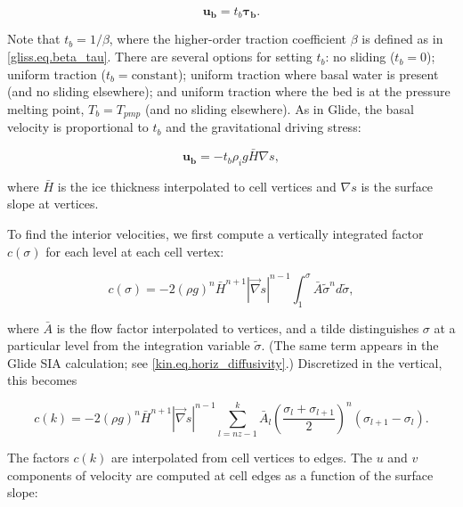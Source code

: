 {\begin{equation}
  \mathbf{u_b} = t_b \mathbf{\tau_b}.
\end{equation}

\noindent
Note that $t_b = 1/\beta$, where the higher-order traction coefficient $\beta$ 
is defined as in \eqref{gliss.eq.beta_tau}.
There are several options for setting $t_b$: no sliding ($t_b = 0$);
uniform traction ($t_b = \mathrm{constant}$); uniform traction where basal water is present
(and no sliding elsewhere); and uniform traction where the bed is at the pressure melting point,
$T_b = T_{pmp}$ (and no sliding elsewhere).
As in Glide, the basal velocity is proportional to $t_b$ and the gravitational driving stress:

\begin{equation}
  \label{gliss.eq.velo_bed_sia}
        \mathbf{u_b} = -{{t}_{b}}{{\rho }_{i}} g \bar{H} \nabla s,
\end{equation}

\noindent
where $\bar{H}$ is the ice thickness interpolated to cell vertices
and $\nabla s$ is the surface slope at vertices.

To find the interior velocities, we
first compute a vertically integrated factor $c(\sigma)$ for each level at each cell vertex:

\begin{equation}
  \label{gliss.eq.vert_factor_sia}
  c(\sigma) = -2(\rho g)^n \bar{H}^{n+1} |\vec\nabla s|^{n-1} \int_1^{\sigma} \bar{A} \tilde{\sigma}^n d\tilde{\sigma},
\end{equation}

\noindent
where $\bar{A}$ is the flow factor interpolated to vertices,
and a tilde distinguishes $\sigma$ at a particular level from the integration variable $\tilde{\sigma}$.
(The same term appears in the Glide SIA calculation; see \eqref{kin.eq.horiz_diffusivity}.)
Discretized in the vertical, this becomes

\begin{equation}
  \label{gliss.eq.vert_factor_sia_discrete}
  c(k) = -2(\rho g)^n \bar{H}^{n+1} |\vec\nabla s|^{n-1} 
  \sum\limits_{l=nz-1}^{k} {{{{\bar{A}}}_{l}}}{{\left( \frac{{{\sigma }_{l}}+{{\sigma }_{l+1}}}{2} \right)}^{n}}\left( 
               {{\sigma }_{l+1}}-{{\sigma }_{l}} \right).
\end{equation}

\noindent
The factors $c(k)$ are interpolated from cell vertices to edges.  The $u$ and $v$ 
components of velocity are computed at cell edges as a function of the surface slope: 

}

